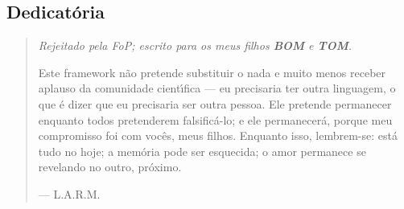 \documentclass[11pt]{article}
\theoremstyle{definition}\newtheorem{deriv}{Derivação}
\begin{document}
\subsection*{Dedicat\'oria}\begin{quote}\itshape Rejeitado pela FoP; escrito para os meus filhos \textbf{BOM} e \textbf{TOM}.\par\medskip Este framework n\~ao pretende substituir o nada e muito menos receber aplauso da comunidade cient\'\i{}fica --- eu precisaria ter outra linguagem, o que \'e dizer que eu precisaria ser outra pessoa. Ele pretende permanecer enquanto todos pretenderem falsific\'a-lo; e ele permanecer\'a, porque meu compromisso foi com voc\^es, meus filhos. Enquanto isso, lembrem-se: est\'a tudo no hoje; a mem\'oria pode ser esquecida; o amor permanece se revelando no outro, pr\'oximo.\par\medskip\upshape\hfill --- L.A.R.M.\end{quote}
\end{document}
